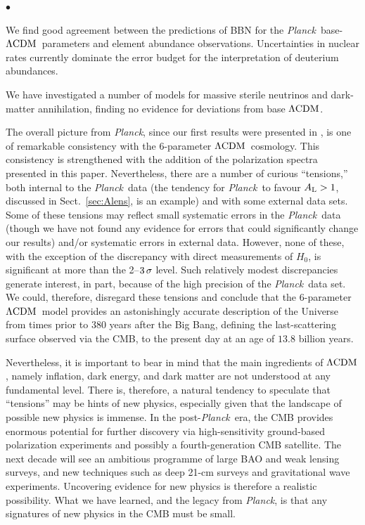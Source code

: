 \documentclass[longauth,traditabstract]{aa}
\def\Planck{\textit{Planck}}
\def\,{\thinspace}
\newenvironment{unindentedlist}{
 \begin{list}{{$\bullet$}}{
  \setlength\partopsep{0pt}
  \setlength\parskip{0pt}
  \setlength\parsep{0pt}
  \setlength\topsep{0pt}
  \setlength\itemsep{0pt}
  \setlength{\itemindent}{\leftmargin}
  \setlength{\leftmargin}{0pt}
 }
}{
 \end{list}
}
\newcommand{\lcdm}{\texorpdfstring{{$\rm{\Lambda CDM}$}}{ΛCDM}}
\newcommand{\Alens}{A_{\rm L}}
\providecommand{\LCDM}{{$\rm{\Lambda CDM}$}}
\newcommand{\paramsI}{\citetalias{planck2013-p11}}
\newcommand{\planck}{\Planck}
\newcommand{\Alenssec}{Sect.~\ref{sec:Alens}}
\begin{document}
\begin{unindentedlist}
\item
We find good agreement between the predictions of BBN for the \planck\
base-\lcdm\ parameters and element abundance
observations. Uncertainties in nuclear rates currently dominate the
error budget for the interpretation of deuterium abundances.

\item We have investigated a number of models for massive sterile neutrinos and dark-matter annihilation, finding no evidence for deviations from base \lcdm.

\end{unindentedlist}
\vskip 1pt

The overall picture from \Planck, since our first results were
presented in \paramsI, is one of remarkable consistency with the
6-parameter \LCDM\ cosmology. This consistency is strengthened with
the addition of the polarization spectra presented in this
paper. Nevertheless, there are a number of curious ``tensions,'' both
internal to the \Planck\ data (the tendency for \Planck\ to favour
$\Alens >1$, discussed in \Alenssec, is an example) and with some
external data sets.  Some of these tensions may reflect small systematic
errors in the \Planck\ data (though we have not found any evidence for
errors that could significantly change our results) and/or systematic
errors in external data. However, none of these, with the exception of the discrepancy
with direct measurements of $H_0$,  is significant at more than the
2--$3\,\sigma$ level. Such relatively modest discrepancies generate interest, in part,
because of the high precision of the \Planck\ data set.
We could, therefore, disregard these tensions
and conclude that the 6-parameter
\LCDM\ model provides an astonishingly accurate description of the Universe
from times prior to 380\,000 years after the Big Bang, defining the last-scattering
surface observed via the CMB, to the present day at an age of $13.8$ billion years.

Nevertheless, it is important to bear in mind that the main ingredients
of \LCDM, namely inflation, dark energy, and dark matter are not
understood at any fundamental level. There is, therefore, a natural
tendency to speculate that ``tensions'' may be hints of new physics,
especially given that the landscape of possible new physics is
immense.  In the post-\Planck\ era, the CMB provides enormous
potential for further discovery via high-sensitivity ground-based
polarization experiments and possibly a fourth-generation CMB
satellite. The next decade will see an ambitious programme of large
BAO and weak lensing surveys, and new techniques such as deep 21-cm
surveys and gravitational wave experiments. Uncovering evidence for new physics
is therefore a realistic possibility.  What we have learned, and the
legacy from \Planck, is that any signatures of new physics in the CMB
must be small.
\end{document}
